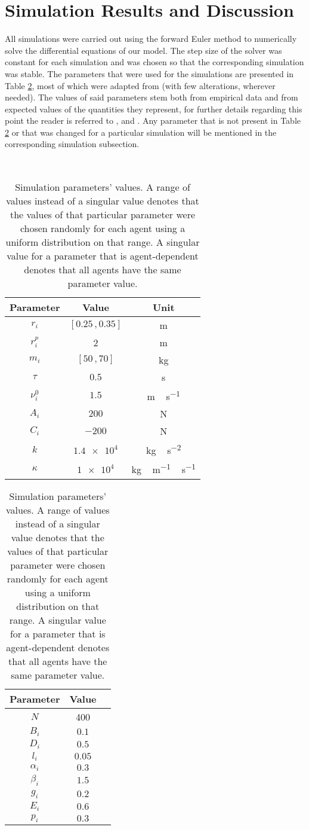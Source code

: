 \section{Simulation Results and Discussion} \label{sec:6-simulation}
All simulations were carried out using the forward Euler method to numerically solve the differential equations of our model. The step size of the solver was constant for each simulation and was chosen so that the corresponding simulation was stable. The parameters that were used for the simulations are presented in Table \ref{tab:param}, most of which were adapted from \cite{Wang2016} (with few alterations, wherever needed). The values of said parameters stem both from empirical data and from expected values of the quantities they represent, for further details regarding this point the reader is referred to \cite{Helbing2000}, \cite{Zainuddin2010} and \cite{Wang2016}. Any parameter that is not present in Table \ref{tab:param} or that was changed for a particular simulation will be mentioned in the corresponding simulation subsection.

\begin{table}[ht!]
	\, \hfill
	\begin{tabular}{c c c}
		\hline
		Parameter & Value & Unit \\ \hline
		$r_i$ & $[0.25 \,, 0.35]$ & \si{\meter} \\
		$r_i^p$ & 2 & \si{\meter} \\
		$m_i$ & $[50 \,, 70]$ & \si{\kilogram} \\
		$\tau$ & $0.5$ & \si{\second} \\
		$\nu_i^0$ & $1.5$ & \si{\meter\,\second^{-1}} \\
		$A_i$ & $200$ & \si{\newton} \\
		$C_i$ & $-200$ & \si{\newton} \\
		$k$ & $\num{1.4e4}$ & \si{\kilogram\,\second^{-2}} \\
		$\kappa$ & $\num{1e4}$ & \si{\kilogram\,\meter^{-1}\,\second^{-1}} \\
	\end{tabular}
	\hfill
	\begin{tabular}{c c c}
		\hline
		Parameter & Value & \\ \hline
		$N$ & 400 & \\
		$B_i$ & $0.1$ &  \\
		$D_i$ & $0.5$ &  \\
		$l_i$ & $0.05$ &  \\
		$\alpha_i$ & $0.3$ &  \\
		$\beta_i$ & $1.5$ &  \\
		$g_i$ & $0.2$ &  \\
		$E_i$ & $0.6$ &  \\
		$p_i$ & $0.3$ &  \\
	\end{tabular}
	\hfill \,
	\caption{Simulation parameters' values. A range of values instead of a singular value denotes that the values of that particular parameter were chosen randomly for each agent using a uniform distribution on that range. A singular value for a parameter that is agent-dependent denotes that all agents have the same parameter value.}
	\label{tab:param}
\end{table}


